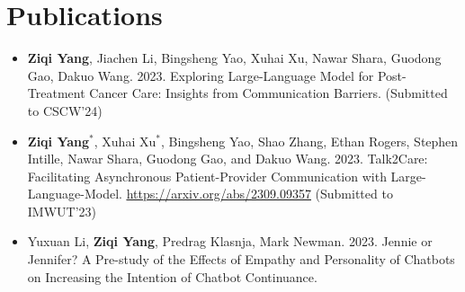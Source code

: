 \section{\textbf{Publications}}
\vspace{1mm}

\begin{justify}\begin{itemize}[leftmargin=3ex, rightmargin=2ex, noitemsep,labelsep=1.2mm,itemsep=1mm, label={$\circ$}]
\item \textbf{Ziqi Yang}, Jiachen Li, Bingsheng Yao, Xuhai Xu, Nawar Shara, Guodong Gao, Dakuo Wang. 2023. Exploring Large-Language Model for Post-Treatment Cancer Care: Insights from Communication Barriers. (Submitted to CSCW'24)
\item \textbf{Ziqi Yang$^*$}, Xuhai Xu$^*$, Bingsheng Yao, Shao Zhang, Ethan Rogers, Stephen Intille, Nawar Shara, Guodong Gao, and Dakuo Wang. 2023. Talk2Care: Facilitating Asynchronous Patient-Provider Communication with Large-Language-Model. \href{https://arxiv.org/abs/2309.09357}{\underline{https://arxiv.org/abs/2309.09357}} (Submitted to IMWUT'23)
\item Yuxuan Li, \textbf{Ziqi Yang}, Predrag Klasnja, Mark Newman. 2023. Jennie or Jennifer? A Pre-study of the Effects of Empathy and Personality of Chatbots on Increasing the Intention of Chatbot Continuance.
\end{itemize}
\end{justify}


      \vspace{-5.0mm}